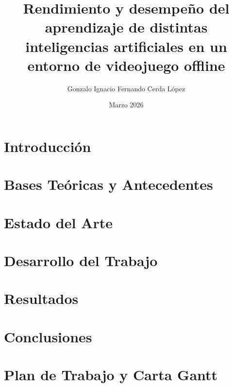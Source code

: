 \documentclass[final,letterpaper,oneside,numbers,11pt,singlespace,spanish]{ezthesis}
\author{Gonzalo Ignacio Fernando Cerda López}
\title{Rendimiento y desempeño del aprendizaje de distintas inteligencias artificiales en un entorno de videojuego offline\\}
\date{Marzo 2026}
\begin{document}
\cleardoublepage
{}
\setcounter{page}{1}





%





\renewcommand\contentsname{Índice General}
\tableofcontents


\renewcommand{\listfigurename}{Índice de Figuras}
\listoffigures


\renewcommand{\listtablename}{Índice de Tablas}
\listoftables

\cleardoublepage
{}
\setcounter{page}{1}

\chapter{Introducción}\label{cap:introduccion}


\chapter{Bases Teóricas y Antecedentes}\label{cap:marco_teorico}


\chapter{Estado del Arte}\label{cap:estado_del_arte}


\chapter{Desarrollo del Trabajo} \label{cap:metodologia}


\chapter{Resultados}  \label{cap:aplicacion}


\chapter{Conclusiones} \label{cap:conclusion}





\appendix

\chapter{Plan de Trabajo y Carta Gantt}
\label{anexo:Gantt}

\end{document}

